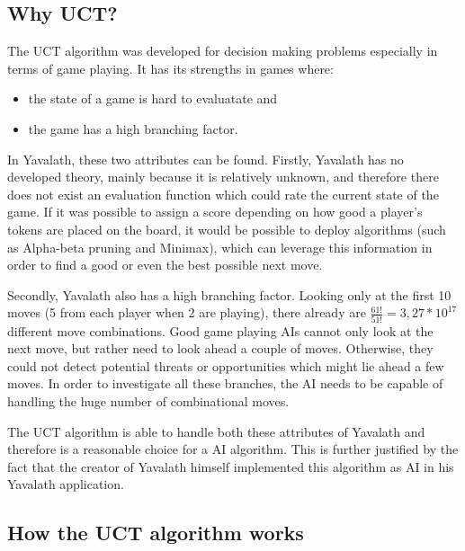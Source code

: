 \documentclass[german]{report}
\begin{document}
\subsection{Why UCT?}
The UCT algorithm was developed for decision making problems especially in terms
of game playing. It has its strengths in games where:
\begin{itemize}
	\item the state of a game is hard to evaluatate and
	\item the game has a high branching factor.
\end{itemize}

In Yavalath, these two attributes can be found. Firstly, Yavalath has no
developed theory, mainly because it is relatively unknown, and therefore there
does not exist an evaluation function which could rate the current state of the
game. If it was possible to assign a score depending on how good a player's
tokens are placed on the board, it would be possible to deploy algorithms (such
as Alpha-beta pruning and Minimax), which can leverage this information in order
to find a good or even the best possible next move.

Secondly, Yavalath also has a high branching factor. Looking only at the first
10 moves (5 from each player when 2 are playing), there already are
\(\frac{61!}{51!}=3,27*10^17\) different move combinations. Good game playing
AIs cannot only look at the next move, but rather need to look ahead a couple of
moves. Otherwise, they could not detect potential threats or opportunities which
might lie ahead a few moves. In order to investigate all these branches, the AI
needs to be capable of handling the huge number of combinational moves.

The UCT algorithm is able to handle both these attributes of Yavalath and
therefore is a reasonable choice for a AI algorithm. This is further justified
by the fact that the creator of Yavalath himself implemented this algorithm as
AI in his Yavalath application. %

\subsection{How the UCT algorithm works}
\end{document}
